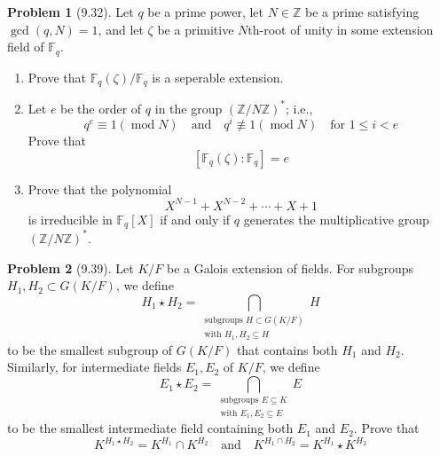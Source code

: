 \documentclass[12pt]{article}
\theoremstyle{definition}
\newtheorem{problem}{Problem}
\DeclareMathOperator{\modd}{mod}
\begin{document}
\begin{problem}[9.32]
    Let $q$ be a prime power, let $N \in \mathbb{Z}$ be a prime satisfying $\gcd(q, N) = 1$, and let $\zeta$ be a primitive $N$th-root of unity in some extension field of $\mathbb{F}_q$.
    \begin{enumerate}[label=(\alph*)]
        \item Prove that $\mathbb{F}_q(\zeta)/\mathbb{F}_q$ is a seperable extension.
        \begin{solution}

        \end{solution}

        \item Let $e$ be the order of $q$ in the group $(\mathbb{Z}/N\mathbb{Z})^*$; i.e.,
              \[
                  q^e \equiv 1 (\modd{N}) \quad \text{and} \quad q^i \not\equiv 1 (\modd{N}) \quad \text{for } 1 \leq i < e
              \]
              Prove that
              \[
                    [\mathbb{F}_q(\zeta) : \mathbb{F}_q] = e
              \]
        \begin{solution}

        \end{solution}

        \item Prove that the polynomial
              \[
                  X^{N-1} + X^{N-2} + \cdots + X + 1
              \]
            is irreducible in $\mathbb{F}_q[X]$ if and only if $q$ generates the multiplicative group $(\mathbb{Z}/N\mathbb{Z})^*$.
        \begin{solution}

        \end{solution}
    \end{enumerate}
\end{problem}

\begin{problem}[9.39]
    Let $K/F$ be a Galois extension of fields. For subgroups $H_1, H_2 \subset G(K/F)$, we define
    \[
        H_1 \star H_2 = \bigcap_{\substack{\text{subgroups } H \subset G(K/F)\\\text{with } H_1, H_2 \subseteq H}} H 
    \]
    to be the smallest subgroup of $G(K/F)$ that contains both $H_1$ and $H_2$. Similarly, for intermediate fields $E_1, E_2$ of $K/F$, we define
    \[
        E_1 \star E_2 = \bigcap_{\substack{\text{subgroups } E \subseteq K\\\text{with } E_1, E_2 \subseteq E}} E
    \]
    to be the smallest intermediate field containing both $E_1$ and $E_2$. Prove that
    \[
        K^{H_1 \star H_2} = K^{H_1} \cap K^{H_2} \quad \text{and} \quad K^{H_1 \cap H_2} = K^{H_1} \star K^{H_2}
    \]
    \begin{solution}

    \end{solution}
\end{problem}
\end{document}
